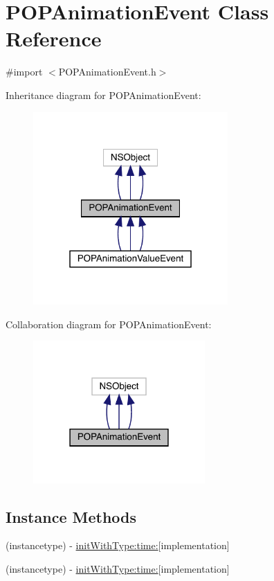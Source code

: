\hypertarget{interface_p_o_p_animation_event}{}\section{P\+O\+P\+Animation\+Event Class Reference}
\label{interface_p_o_p_animation_event}


{\ttfamily \#import $<$P\+O\+P\+Animation\+Event.\+h$>$}



Inheritance diagram for P\+O\+P\+Animation\+Event\+:\nopagebreak
\begin{figure}[H]
\begin{center}
\leavevmode
\includegraphics[width=211pt]{interface_p_o_p_animation_event__inherit__graph}
\end{center}
\end{figure}


Collaboration diagram for P\+O\+P\+Animation\+Event\+:\nopagebreak
\begin{figure}[H]
\begin{center}
\leavevmode
\includegraphics[width=186pt]{interface_p_o_p_animation_event__coll__graph}
\end{center}
\end{figure}
\subsection*{Instance Methods}
\begin{DoxyCompactItemize}
\item 
(instancetype) -\/ \mbox{\hyperlink{interface_p_o_p_animation_event_a58e93d7371be1fa88ba66202784c759b}{init\+With\+Type\+:time\+:}}{\ttfamily  \mbox{[}implementation\mbox{]}}
\item 
(instancetype) -\/ \mbox{\hyperlink{interface_p_o_p_animation_event_a58e93d7371be1fa88ba66202784c759b}{init\+With\+Type\+:time\+:}}{\ttfamily  \mbox{[}implementation\mbox{]}}
\end{DoxyCompactItemize}
